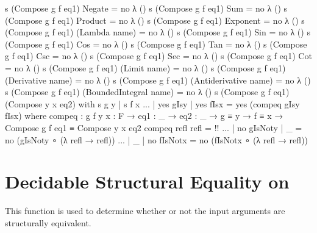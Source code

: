 \documentclass{report}
\begin{document}
\begin{code}
    s (Compose g f eq1) Negate = no λ ()
    s (Compose g f eq1) Sum = no λ ()
    s (Compose g f eq1) Product = no λ ()
    s (Compose g f eq1) Exponent = no λ ()
    s (Compose g f eq1) (Lambda name) = no λ ()
    s (Compose g f eq1) Sin = no λ ()
    s (Compose g f eq1) Cos = no λ ()
    s (Compose g f eq1) Tan = no λ ()
    s (Compose g f eq1) Csc = no λ ()
    s (Compose g f eq1) Sec = no λ ()
    s (Compose g f eq1) Cot = no λ ()
    s (Compose g f eq1) (Limit name) = no λ ()
    s (Compose g f eq1) (Derivative name) = no λ ()
    s (Compose g f eq1) (Antiderivative name) = no λ ()
    s (Compose g f eq1) (BoundedIntegral name) = no λ ()
    s (Compose g f eq1) (Compose y x eq2) with s g y | s f x
    ... | yes gIsy | yes fIsx = yes (compeq gIsy fIsx)
      where
      compeq : {g f y x : F} →
               {eq1 : _} →
               {eq2 : _} →
               g ≡ y →
               f ≡ x →
               Compose g f eq1 ≡ Compose y x eq2
      compeq refl refl = {!!}
    ... | no gIsNoty | _ = no (gIsNoty ∘ (λ {refl → refl}))
    ... | _ | no fIsNotx = no (fIsNotx ∘ (λ {refl → refl}))
\end{code}

\section{Decidable Structural Equality on }
This function is used to determine whether or not the input arguments are structurally equivalent.
\end{document}
